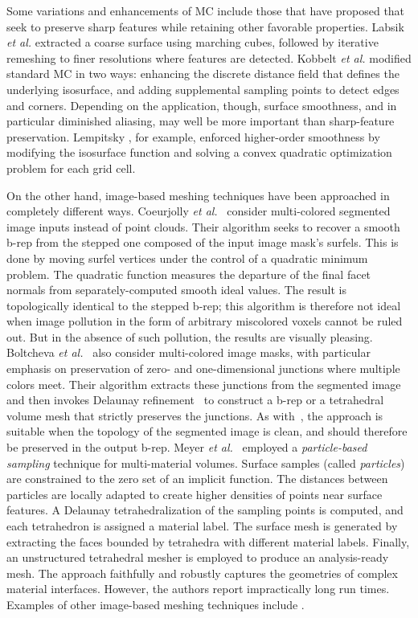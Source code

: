 Some variations and enhancements of MC include those that have proposed that seek to preserve sharp features while retaining other favorable properties.  Labsik \textit{et al.} \cite{labsik_2002} extracted a coarse surface using marching cubes, followed by iterative remeshing to finer resolutions where features are detected.  Kobbelt \textit{et al.} \cite{kobbelt_2001} modified standard MC in two ways:  enhancing the discrete distance field that defines the underlying isosurface, and adding supplemental sampling points to detect edges and corners. Depending on the application, though, surface smoothness, and in particular diminished aliasing, may well be more important than sharp-feature preservation. Lempitsky \cite{lempitsky_2010}, for example, enforced higher-order smoothness by modifying the isosurface function and solving a convex quadratic optimization problem for each grid cell.

On the other hand, image-based meshing techniques have been approached in completely different ways.  Coeurjolly \textit{et al.}~\cite{coeurjolly2021} consider multi-colored segmented image inputs instead of point clouds.  Their algorithm seeks to recover a smooth b-rep from the stepped one composed of the input image mask's surfels.  This is done by moving surfel vertices under the control of a quadratic minimum problem.  The quadratic function measures the departure of the final facet normals from separately-computed smooth ideal values.  The result is topologically identical to the stepped b-rep; this algorithm is therefore not ideal when image pollution in the form of arbitrary miscolored voxels cannot be ruled out.  But in the absence of such pollution, the results are visually pleasing.  Boltcheva \textit{et al.}~\cite{boltcheva2009} also consider multi-colored image masks, with particular emphasis on preservation of zero- and one-dimensional junctions where multiple colors meet.  Their algorithm extracts these junctions from the segmented image and then invokes Delaunay refinement~\cite{pons2007} to construct a b-rep or a tetrahedral volume mesh that strictly preserves the junctions.  As with~\cite{coeurjolly2021}, the approach is suitable when the topology of the segmented image is clean, and should therefore be preserved in the output b-rep. Meyer \textit{et al.}~\cite{meyer_2008} employed a \textit{particle-based sampling} technique for multi-material volumes. Surface samples (called \textit{particles}) are constrained to the zero set of an implicit function. The distances between particles are locally adapted to create higher densities of points near surface features. A Delaunay tetrahedralization of the sampling points is computed, and each tetrahedron is assigned a material label. The surface mesh is generated by extracting the faces bounded by tetrahedra with different material labels. Finally, an unstructured tetrahedral mesher is employed to produce an analysis-ready mesh. The approach faithfully and robustly captures the geometries of complex material interfaces. However, the authors report impractically long run times.
Examples of other image-based meshing techniques include \cite{fang_2009, mohamed_2004, jermyn_2013, boissonnat_2009}.

